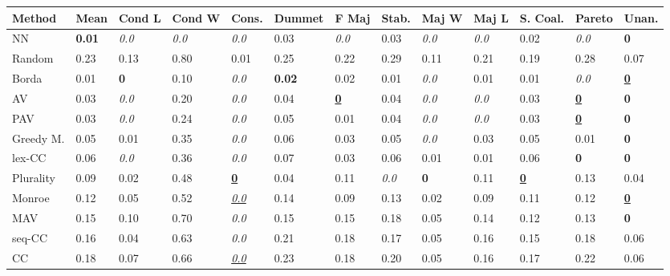 \begin{tabular}{lllllllllllll}
\toprule
Method & Mean & Cond L & Cond W & Cons. & Dummet & F Maj & Stab. & Maj W & Maj L & S. Coal. & Pareto & Unan. \\
\midrule
NN & \textbf{0.01} & \textit{0.0} & \textit{0.0} & \textit{0.0} & 0.03 & \textit{0.0} & 0.03 & \textit{0.0} & \textit{0.0} & 0.02 & \textit{0.0} & \textbf{0} \\
Random & 0.23 & 0.13 & 0.80 & 0.01 & 0.25 & 0.22 & 0.29 & 0.11 & 0.21 & 0.19 & 0.28 & 0.07 \\
Borda & 0.01 & \textbf{0} & 0.10 & \textit{0.0} & \textbf{0.02} & 0.02 & 0.01 & \textit{0.0} & 0.01 & 0.01 & \textit{0.0} & \underline{\textbf{0}} \\
AV & 0.03 & \textit{0.0} & 0.20 & \textit{0.0} & 0.04 & \underline{\textbf{0}} & 0.04 & \textit{0.0} & \textit{0.0} & 0.03 & \underline{\textbf{0}} & \textbf{0} \\
PAV & 0.03 & \textit{0.0} & 0.24 & \textit{0.0} & 0.05 & 0.01 & 0.04 & \textit{0.0} & \textit{0.0} & 0.03 & \underline{\textbf{0}} & \textbf{0} \\
Greedy M. & 0.05 & 0.01 & 0.35 & \textit{0.0} & 0.06 & 0.03 & 0.05 & \textit{0.0} & 0.03 & 0.05 & 0.01 & \textbf{0} \\
lex-CC & 0.06 & \textit{0.0} & 0.36 & \textit{0.0} & 0.07 & 0.03 & 0.06 & 0.01 & 0.01 & 0.06 & \textbf{0} & \textbf{0} \\
Plurality & 0.09 & 0.02 & 0.48 & \underline{\textbf{0}} & 0.04 & 0.11 & \textit{0.0} & \textbf{0} & 0.11 & \underline{\textbf{0}} & 0.13 & 0.04 \\
Monroe & 0.12 & 0.05 & 0.52 & \underline{\textit{0.0}} & 0.14 & 0.09 & 0.13 & 0.02 & 0.09 & 0.11 & 0.12 & \underline{\textbf{0}} \\
MAV & 0.15 & 0.10 & 0.70 & \textit{0.0} & 0.15 & 0.15 & 0.18 & 0.05 & 0.14 & 0.12 & 0.13 & \textbf{0} \\
seq-CC & 0.16 & 0.04 & 0.63 & \textit{0.0} & 0.21 & 0.18 & 0.17 & 0.05 & 0.16 & 0.15 & 0.18 & 0.06 \\
CC & 0.18 & 0.07 & 0.66 & \underline{\textit{0.0}} & 0.23 & 0.18 & 0.20 & 0.05 & 0.16 & 0.17 & 0.22 & 0.06 \\
\bottomrule
\end{tabular}
